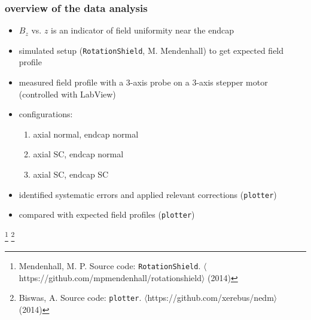 \documentclass{beamer}
\newcommand{\bottomcite}{\let\thefootnote\relax\footnote}
\begin{document}
%
%
%
%

\begin{frame}
\frametitle{overview of the data analysis}

    \begin{itemize}
        \item $B_z$ vs. $z$ is an indicator of field uniformity near the endcap \pause
        \item simulated setup (\texttt{RotationShield}, M. Mendenhall) to get
            expected field profile \pause
        \item measured field profile with a 3-axis probe on a 3-axis stepper motor (controlled with LabView) \pause
        \item configurations:
            \begin{enumerate}
                \item axial normal, endcap normal
                \item axial SC, endcap normal
                \item axial SC, endcap SC \pause
            \end{enumerate}
        \item identified systematic errors and applied relevant corrections (\texttt{plotter})
        \item compared with expected field profiles (\texttt{plotter})
    \end{itemize}

    \bottomcite{Mendenhall, M. P. Source code: \texttt{RotationShield}.
    $\langle$https://github.com/mpmendenhall/rotationshield$\rangle$ (2014)}
    \bottomcite{Biswas, A. Source code: \texttt{plotter}.
    $\langle$https://github.com/xerebus/nedm$\rangle$ (2014)}

\end{frame}
\end{document}
